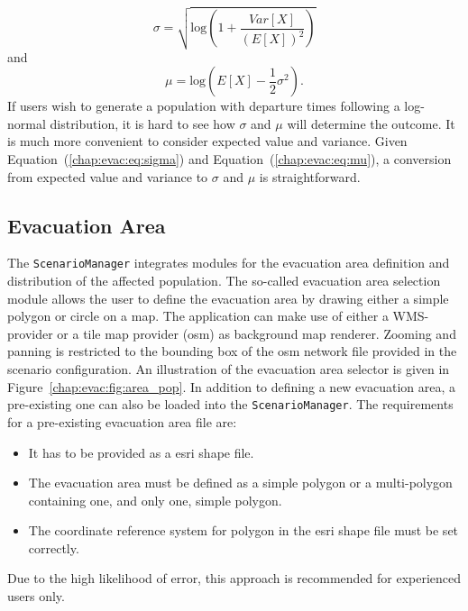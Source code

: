 \begin{equation}
\sigma = \sqrt{\text{log}(1+\frac{Var[X]}{(E[X])^2})}\label{chap:evac:eq:sigma}
\end{equation}
and 
\begin{equation}
\mu = \text{log}(E[X] - \frac{1}{2}\sigma^2).\label{chap:evac:eq:mu}
\end{equation}
If users wish to generate a population with departure times following a log-normal distribution, it is hard to see how $\sigma$ and $\mu$ will determine the outcome. It is much more convenient to consider expected value and variance. Given Equation~(\ref{chap:evac:eq:sigma}) and Equation~(\ref{chap:evac:eq:mu}), a conversion from expected value and variance to $\sigma$ and $\mu$ is straightforward.

\subsection{Evacuation Area}%
The \lstinline|ScenarioManager| integrates modules for the evacuation area definition and distribution of the affected population. The so-called evacuation area selection module allows the user to define the evacuation area by drawing either a simple polygon or circle on a map. The application can make use of either a WMS-provider or a tile map provider (\eg \gls{osm}) as background map renderer. Zooming and panning is restricted to the bounding box of the \gls{osm} network file provided in the scenario configuration. An illustration of the evacuation area selector is given in Figure~\ref{chap:evac:fig:area_pop}. In addition to defining a new evacuation area, a pre-existing one can also be loaded into the \lstinline|ScenarioManager|. The requirements for a pre-existing evacuation area file are:
\begin{itemize}\styleItemize
\item It has to be provided as a \gls{esri} shape file.
\item The evacuation area must be defined as a simple polygon or a multi-polygon containing one, and only one, simple polygon.
\item The coordinate reference system for polygon in the \gls{esri} shape file must be set correctly. 
\end{itemize}
Due to the high likelihood of error, this approach is recommended for experienced users only.


